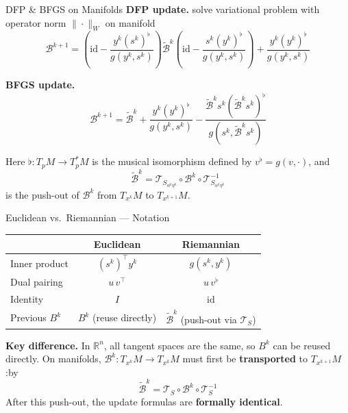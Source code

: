 \documentclass[10pt,aspectratio=169]{beamer}
\newcommand{\RR}{\mathbb{R}}
\newcommand{\VT}{\mathcal{T}}
\begin{document}
\begin{frame}{DFP \& BFGS on Manifolds}
\textbf{DFP update.} solve variational problem with operator norm $\|\cdot\|_W$ on manifold
$$\mathcal{B}^{k+1} = \left(\mathrm{id} - \frac{y^k(s^k)^\flat}{g(y^k,s^k)}\right)\tilde{\mathcal{B}}^k\left(\mathrm{id} - \frac{s^k(y^k)^\flat}{g(y^k,s^k)}\right) + \frac{y^k(y^k)^\flat}{g(y^k,s^k)}$$

\textbf{BFGS update.}
$$\mathcal{B}^{k+1} = \tilde{\mathcal{B}}^k + \frac{y^k(y^k)^\flat}{g(y^k,s^k)} - \frac{\tilde{\mathcal{B}}^ks^k(\tilde{\mathcal{B}}^ks^k)^\flat}{g(s^k,\tilde{\mathcal{B}}^ks^k)}$$

Here $\flat: T_pM\to T_p^*M$ is the musical isomorphism defined by $v^\flat = g(v,\cdot)$, and
$$\tilde{\mathcal{B}}^k = \VT_{S_{\alpha^k\eta^k}}\circ\mathcal{B}^k\circ\VT_{S_{\alpha^k\eta^k}}^{-1}$$
is the push-out of $\mathcal{B}^k$ from $T_{x^k}M$ to $T_{x^{k+1}}M$.
\end{frame}

\begin{frame}{Euclidean vs.\ Riemannian --- Notation}
\centering
\renewcommand{\arraystretch}{1.6}
\begin{tabular}{@{}lcc@{}}
\toprule
& \textbf{Euclidean} & \textbf{Riemannian} \\
\midrule
Inner product & $(s^k)^\top y^k$ & $g(s^k,y^k)$ \\
Dual pairing & $u\, v^\top$ & $u\, v^\flat$ \\
Identity & $I$ & $\mathrm{id}$ \\
Previous $B^k$ & $B^k$ (reuse directly) & $\tilde{\mathcal{B}}^k$ (push-out via $\VT_S$) \\
\bottomrule
\end{tabular}

\bigskip
\textbf{Key difference.} In $\RR^n$, all tangent spaces are the same, so $B^k$ can be reused directly. On manifolds, $\mathcal{B}^k: T_{x^k}M\to T_{x^k}M$ must first be \textbf{transported} to $T_{x^{k+1}}M$:by
$$\tilde{\mathcal{B}}^k = \VT_S\circ\mathcal{B}^k\circ\VT_S^{-1}$$
After this push-out, the update formulas are \textbf{formally identical}.
\end{frame}
\end{document}
